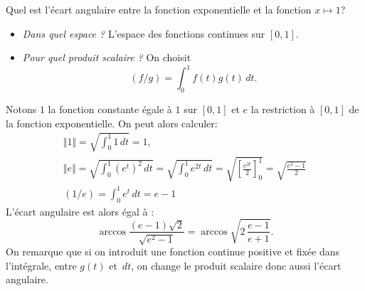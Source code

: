 \begin{exple}
Quel est l'écart angulaire entre la fonction exponentielle et la fonction $x \mapsto 1$?
\begin{itemize}
\item \emph{Dans quel espace ?} L'espace des fonctions continues sur $[0,1]$.
\item \emph{Pour quel produit scalaire ?} On choisit
\begin{displaymath}
(f/g) = \int_{0}^{1} f(t) g(t) \,dt.
\end{displaymath}
\end{itemize}
Notons $1$ la fonction constante égale à $1$ sur $[0,1]$ et $e$ la restriction à $[0,1]$ de la fonction exponentielle. On peut alors calculer:
\begin{multline*}
 \Vert 1 \Vert  = \sqrt{ \int_{0}^{1} 1 \,dt } = 1, \\
 \Vert e \Vert  = \sqrt{ \int_{0}^{1} (e^{t})^2 \,dt } = \sqrt{ \int_{0}^{1} e^{2t} \,dt } = \sqrt{ \left[ \frac{e^{2t}}{2} \right]_{0}^{1} } = \sqrt{ \frac{e^2 - 1}{2} }\\
 (1 / e) = \int_{0}^{1} e^{t} \, dt = e - 1
\end{multline*}
L'écart angulaire est alors égal à :
\begin{displaymath}
\displaystyle \arccos \frac{ (e - 1) \sqrt{2} }{ \sqrt{ e^2 - 1 } } = \arccos \sqrt{2 \, \frac{e - 1}{e + 1}}.
\end{displaymath}
On remarque que si on introduit une fonction continue positive et fixée dans l'intégrale, entre $g(t)$ et $\, dt$, on change le produit scalaire donc aussi l'écart angulaire.
\end{exple}
\clearpage

